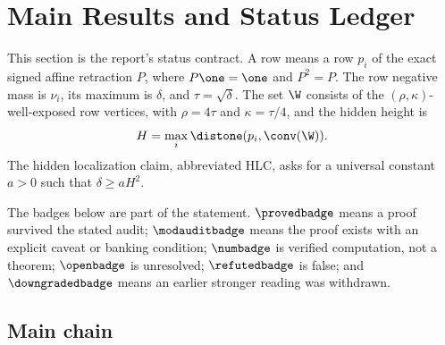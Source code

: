 \section{Main Results and Status Ledger}

This section is the report's status contract.  A row means a row \(p_i\) of
the exact signed affine retraction \(P\), where \(P\one=\one\) and \(P^2=P\).
The row negative mass is \(\nu_i\), its maximum is \(\delta\), and
\(\tau=\sqrt{\delta}\).  The set \(\W\) consists of the
\((\rho,\kappa)\)-well-exposed row vertices, with \(\rho=4\tau\) and
\(\kappa=\tau/4\), and the hidden height is
\[
  H=\max_i \distone(p_i,\conv(\W)).
\]
The hidden localization claim, abbreviated HLC, asks for a universal
constant \(a>0\) such that \(\delta\ge aH^2\).

The badges below are part of the statement.  \(\provedbadge\) means a proof
survived the stated audit; \(\modauditbadge\) means the proof exists with an
explicit caveat or banking condition; \(\numbadge\) is verified computation,
not a theorem; \(\openbadge\) is unresolved; \(\refutedbadge\) is false; and
\(\downgradedbadge\) means an earlier stronger reading was withdrawn.

\subsection{Main chain}

